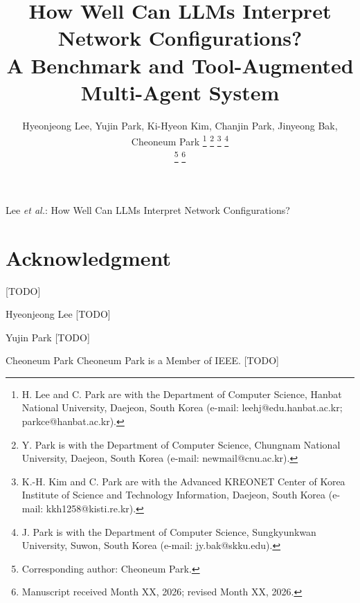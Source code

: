 \documentclass[journal]{IEEEtran}
\begin{document}
\title{How Well Can LLMs Interpret Network Configurations?\\ A Benchmark and Tool-Augmented Multi-Agent System}


\author{
Hyeonjeong Lee, Yujin Park, Ki-Hyeon Kim, Chanjin Park, Jinyeong Bak, Cheoneum Park
\thanks{H. Lee and C. Park are with the Department of Computer Science, Hanbat National University, Daejeon, South Korea (e-mail: leehj@edu.hanbat.ac.kr; parkce@hanbat.ac.kr).}
\thanks{Y. Park is with the Department of Computer Science, Chungnam National University, Daejeon, South Korea (e-mail: newmail@cnu.ac.kr).}
\thanks{K.-H. Kim and C. Park are with the Advanced KREONET Center of Korea Institute of Science and Technology Information, Daejeon, South Korea (e-mail: kkh1258@kisti.re.kr).}
\thanks{J. Park is with the Department of Computer Science, Sungkyunkwan University, Suwon, South Korea (e-mail: jy.bak@skku.edu).}

\thanks{Corresponding author: Cheoneum Park.}
\thanks{Manuscript received Month XX, 2026; revised Month XX, 2026.}
}

%
{Lee \MakeLowercase{\textit{et al.}}: How Well Can LLMs Interpret Network Configurations?}

\maketitle

\begin{abstract}
  
\end{abstract}

\IEEEpeerreviewmaketitle











\section*{Acknowledgment}
[TODO]

\ifCLASSOPTIONcaptionsoff
\newpage
\fi




\begin{IEEEbiographynophoto}{Hyeonjeong Lee}
  [TODO]
\end{IEEEbiographynophoto}

\begin{IEEEbiographynophoto}{Yujin Park}
  [TODO]
\end{IEEEbiographynophoto}

\begin{IEEEbiographynophoto}{Cheoneum Park}
  Cheoneum Park is a Member of IEEE. [TODO]
\end{IEEEbiographynophoto}
\end{document}
